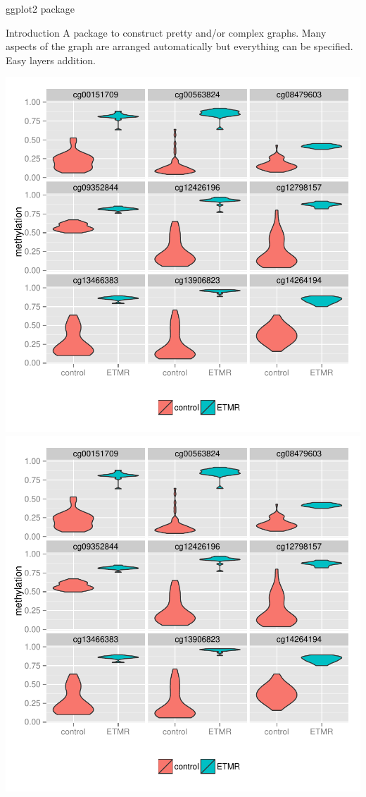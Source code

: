 \documentclass[10pt]{beamer}
\begin{document}
\begin{frame}{{\sf ggplot2} package}
  \begin{block}{Introduction}
    A package to construct pretty and/or complex graphs. Many aspects of the graph are arranged automatically but everything can be specified. Easy layers addition.
  \end{block}
  
  \includegraphics[height=.6\textheight]{../imgs/example-ggplot2.pdf}
  \includegraphics[height=.6\textheight,page=2]{../imgs/example-ggplot2.pdf}

\end{frame}
\end{document}
